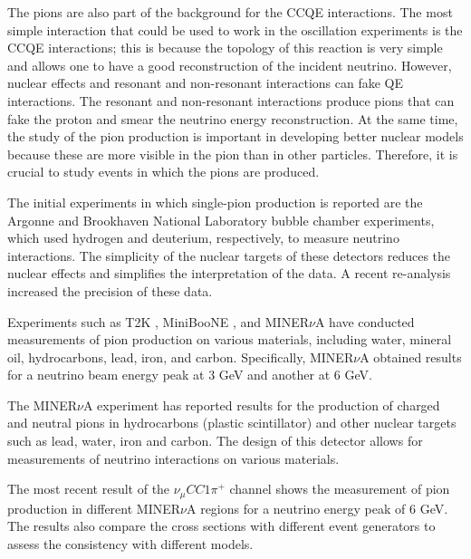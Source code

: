 The pions are also part of the background for the CCQE interactions. The most simple interaction that could be used to work in the oscillation experiments is the CCQE interactions; this is because the topology of this reaction is very simple and allows one to have a good reconstruction of the incident neutrino. However, nuclear effects and resonant and non-resonant interactions can fake QE interactions. The resonant and non-resonant interactions produce pions that can fake the proton and smear the neutrino energy reconstruction. At the same time, the study of the pion production is important in developing better nuclear models because these are more visible in the pion than in other particles. Therefore, it is crucial to study events in which the pions are produced. 

The initial experiments in which single-pion production is reported are the Argonne \cite{PhysRevD.25.1161} and Brookhaven \cite{PhysRevD.34.2554} National Laboratory bubble chamber experiments, which used hydrogen and deuterium, respectively, to measure neutrino interactions. The simplicity of the nuclear targets of these detectors reduces the nuclear effects and simplifies the interpretation of the data. A recent re-analysis increased the precision of these data\cite{PhysRevD.90.112017}.

Experiments such as T2K \cite{PhysRevD.95.012010}, MiniBooNE \cite{Aguilar_Arevalo_2011}, and MINER$\nu$A \cite{Eberly:2014mra, Bercellie.131.011801, PhysRevD.94.052005} have conducted measurements of pion production on various materials, including water, mineral oil, hydrocarbons, lead, iron, and carbon. Specifically, MINER$\nu$A obtained results for a neutrino beam energy peak at 3 GeV and another at 6 GeV.

The MINER$\nu$A experiment has reported results for the production of charged \cite{Bercellie.131.011801, Eberly:2014mra, PhysRevD.94.052005} and neutral \cite{PhysRevD.96.072003, Le_2015} pions in hydrocarbons (plastic scintillator) and other nuclear targets such as lead, water, iron and carbon. The design of this detector allows for measurements of neutrino interactions on various materials.

The most recent result of the $\nu_\mu CC1\pi^+$ channel \cite{Bercellie.131.011801} shows the measurement of pion production in different MINER$\nu$A regions for a neutrino energy peak of 6 GeV. The results also compare the cross sections with different event generators to assess the consistency with different models.

